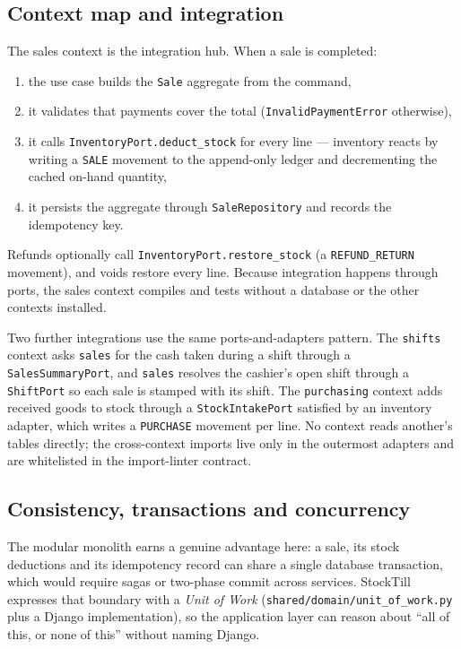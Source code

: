 \documentclass[11pt,a4paper]{article}
\begin{document}
\subsection{Context map and integration}

The sales context is the integration hub. When a sale is completed:

\begin{enumerate}[leftmargin=1.4em]
  \item the use case builds the \texttt{Sale} aggregate from the command,
  \item it validates that payments cover the total (\texttt{InvalidPaymentError} otherwise),
  \item it calls \texttt{InventoryPort.deduct\_stock} for every line --- inventory reacts by writing a
  \texttt{SALE} movement to the append-only ledger and decrementing the cached on-hand quantity,
  \item it persists the aggregate through \texttt{SaleRepository} and records the idempotency key.
\end{enumerate}

Refunds optionally call \texttt{InventoryPort.restore\_stock} (a \texttt{REFUND\_RETURN} movement),
and voids restore every line. Because integration happens through ports, the sales context compiles
and tests without a database or the other contexts installed.

Two further integrations use the same ports-and-adapters pattern. The \texttt{shifts} context asks
\texttt{sales} for the cash taken during a shift through a \texttt{SalesSummaryPort}, and \texttt{sales}
resolves the cashier's open shift through a \texttt{ShiftPort} so each sale is stamped with its
shift. The \texttt{purchasing} context adds received goods to stock through a \texttt{StockIntakePort}
satisfied by an inventory adapter, which writes a \texttt{PURCHASE} movement per line. No context
reads another's tables directly; the cross-context imports live only in the outermost adapters and
are whitelisted in the import-linter contract.

\subsection{Consistency, transactions and concurrency}
\label{sec:consistency}

The modular monolith earns a genuine advantage here: a sale, its stock deductions and its
idempotency record can share a single database transaction, which would require sagas or two-phase
commit across services. StockTill expresses that boundary with a \emph{Unit of Work}
(\texttt{shared/domain/unit\_of\_work.py} plus a Django implementation), so the application layer can
reason about ``all of this, or none of this'' without naming Django.
\end{document}
